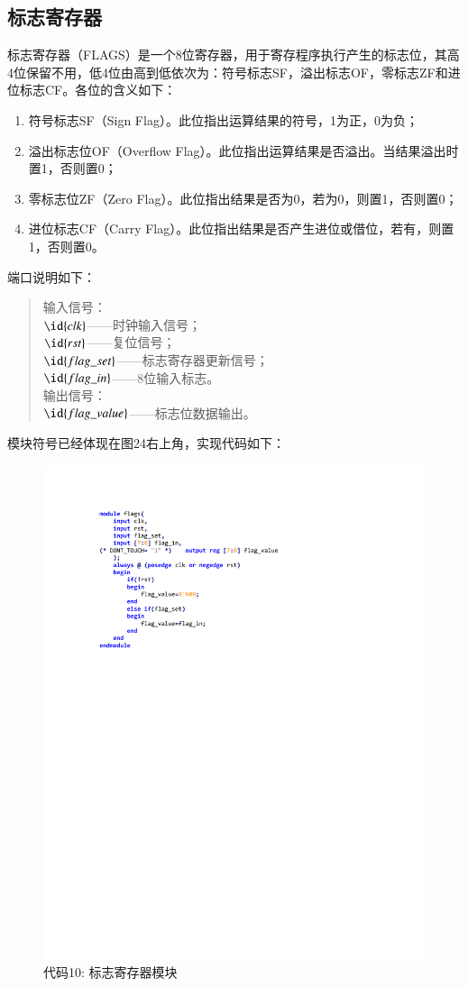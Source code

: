 \documentclass[titlepage, 11pt]{article}
\begin{document}
		\subsection{标志寄存器}
		标志寄存器（FLAGS）是一个8位寄存器，用于寄存程序执行产生的标志位，其高4位保留不用，低4位由高到低依次为：符号标志SF，溢出标志OF，零标志ZF和进位标志CF。各位的含义如下：
			\begin{enumerate}
				\item 符号标志SF（Sign Flag）。此位指出运算结果的符号，1为正，0为负；
				\item 溢出标志位OF（Overflow Flag）。此位指出运算结果是否溢出。当结果溢出时置1，否则置0；
				\item 零标志位ZF（Zero Flag）。此位指出结果是否为0，若为0，则置1，否则置0；
				\item 进位标志CF（Carry Flag）。此位指出结果是否产生进位或借位，若有，则置1，否则置0。
			\end{enumerate}\par 
		端口说明如下：
			\begin{quote}
				输入信号：\\
				$\id{clk}$——时钟输入信号；\\
				$\id{rst}$——复位信号；\\
				$\id{flag\_set}$——标志寄存器更新信号；\\
				$\id{flag\_in}$——8位输入标志。\\
				输出信号：\\
				$\id{flag\_value}$——标志位数据输出。
			\end{quote}\par  
		模块符号已经体现在图24右上角，实现代码如下：
			\begin{figure}[H]
				\centering
				\includegraphics[scale=1]{32.pdf}
				\caption*{代码10: 标志寄存器模块}
			\end{figure}
\end{document}
